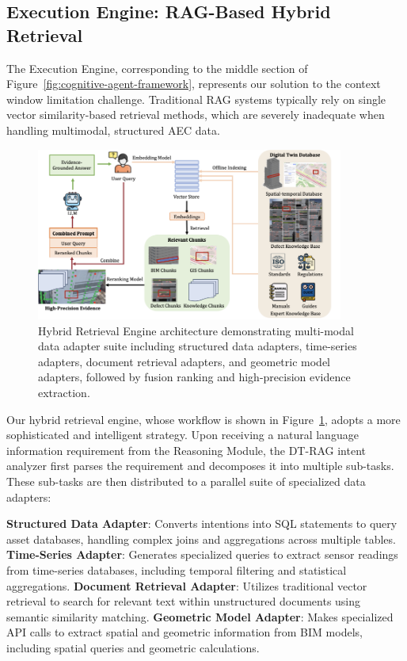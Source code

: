 \subsection{Execution Engine: RAG-Based Hybrid Retrieval}

The Execution Engine, corresponding to the middle section of Figure~\ref{fig:cognitive-agent-framework}, represents our solution to the context window limitation challenge. Traditional RAG systems typically rely on single vector similarity-based retrieval methods, which are severely inadequate when handling multimodal, structured AEC data.

\begin{figure}[htbp]
\centering
\includegraphics[width=0.9\textwidth]{figures/DefectGPT/Hybrid Retrieval Engine.png}
\caption{Hybrid Retrieval Engine architecture demonstrating multi-modal data adapter suite including structured data adapters, time-series adapters, document retrieval adapters, and geometric model adapters, followed by fusion ranking and high-precision evidence extraction.}
\label{fig:hybrid-retrieval-engine}
\end{figure}

Our hybrid retrieval engine, whose workflow is shown in Figure~\ref{fig:hybrid-retrieval-engine}, adopts a more sophisticated and intelligent strategy. Upon receiving a natural language information requirement from the Reasoning Module, the DT-RAG intent analyzer first parses the requirement and decomposes it into multiple sub-tasks. These sub-tasks are then distributed to a parallel suite of specialized data adapters:

\textbf{Structured Data Adapter}: Converts intentions into SQL statements to query asset databases, handling complex joins and aggregations across multiple tables.
\textbf{Time-Series Adapter}: Generates specialized queries to extract sensor readings from time-series databases, including temporal filtering and statistical aggregations.
\textbf{Document Retrieval Adapter}: Utilizes traditional vector retrieval to search for relevant text within unstructured documents using semantic similarity matching.
\textbf{Geometric Model Adapter}: Makes specialized API calls to extract spatial and geometric information from BIM models, including spatial queries and geometric calculations.


